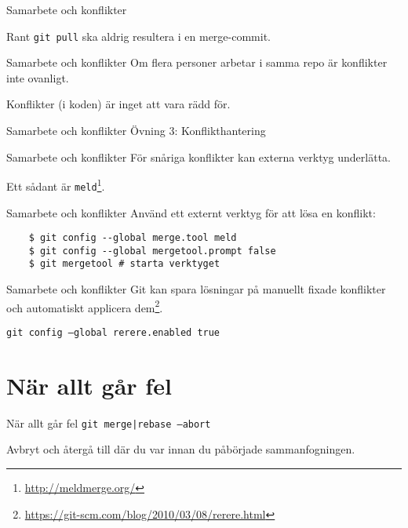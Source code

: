 \documentclass[11pt,xetex]{beamer}
\begin{document}
\begin{frame}{Samarbete och konflikter}
  \begin{alertblock}{\huge Rant}
    \large
    \texttt{git pull} ska aldrig resultera i en merge-commit.
  \end{alertblock}
\end{frame}

\begin{frame}{Samarbete och konflikter}
  \Large
  Om flera personer arbetar i samma repo är konflikter inte ovanligt.

  Konflikter (i koden) är inget att vara rädd för.
\end{frame}

\begin{frame}{Samarbete och konflikter}
  \Large
  Övning 3: Konflikthantering
\end{frame}

\begin{frame}{Samarbete och konflikter}
  \Large
  För snåriga konflikter kan externa verktyg underlätta.

  Ett sådant är \texttt{meld}\footnote{\url{http://meldmerge.org/}}.
\end{frame}

\begin{frame}[fragile]{Samarbete och konflikter}
  \Large
  Använd ett externt verktyg för att lösa en konflikt:

  \begin{verbatim}
    $ git config --global merge.tool meld
    $ git config --global mergetool.prompt false
    $ git mergetool # starta verktyget
  \end{verbatim}
\end{frame}

\begin{frame}{Samarbete och konflikter}
  \Large
  Git kan spara lösningar på manuellt fixade konflikter och automatiskt
  applicera
  dem\footnote{\url{https://git-scm.com/blog/2010/03/08/rerere.html}}.

  \texttt{git config --global rerere.enabled true}
\end{frame}


\section*{När allt går fel}

\begin{frame}{När allt går fel}
  \Large
  \texttt{git {merge|rebase} --abort}

  \normalsize
  Avbryt och återgå till där du var innan du påbörjade sammanfogningen.
\end{frame}
\end{document}
